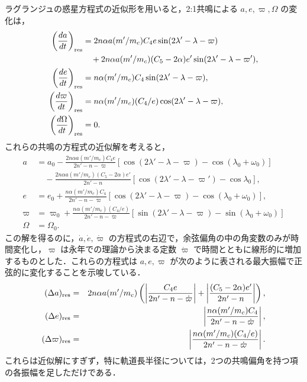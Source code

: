 \documentclass[11pt,a4paper,oneside,onecolumn]{jreport}
\begin{document}
ラグランジュの惑星方程式の近似形を用いると，2:1共鳴による $a, e, \varpi, \Omega$ の変化は，
\begin{align} 
\left( \frac{d a}{d t} \right)_{\rm res} & = 2 n \alpha a (m' / m_c) C_4 e \sin (2 \lambda' - \lambda - \varpi)\nonumber \\
& \quad + 2 n \alpha a (m' / m_c) (C_5 - 2 \alpha) e' \sin (2 \lambda' - \lambda - \varpi'), \\
\left( \frac{d e}{d t} \right)_{\rm res} & = n \alpha (m' / m_c) C_4 \sin (2 \lambda' - \lambda - \varpi), \\
\left( \frac{d \varpi}{d t} \right)_{\rm res} & = n \alpha (m' / m_c) (C_4 / e) \cos (2 \lambda' - \lambda - \varpi), \\
\left( \frac{d \Omega}{d t} \right)_{\rm res} & = 0.
\end{align}
これらの共鳴の方程式の近似解を考えると，
\begin{align}
a & = a_0 - \frac{2 n \alpha a (m' / m_c) C_4 e}{2 n' - n - \dot{\varpi}} [ \cos (2 \lambda' - \lambda - \varpi) - \cos (\lambda_0 + \omega_0) ] \nonumber \\
& \quad - \frac{2 n \alpha a (m' / m_c) (C_5 - 2 \alpha) e'}{2 n' - n} [\cos (2 \lambda' - \lambda - \varpi') - \cos \lambda_0 ], \\
e & = e_0 + \frac{n \alpha (m' / m_c) C_4}{2 n' - n - \dot{\varpi}} [\cos (2 \lambda' - \lambda - \varpi) - \cos (\lambda_0 + \omega_0) ], \\
\varpi & = \varpi_0 + \frac{n \alpha (m' / m_c) (C_4 / e)}{2 n' - n - \dot{\varpi}} [\sin (2 \lambda' - \lambda - \varpi) - \sin (\lambda_0 + \omega_0) ] \\
\Omega & = \Omega_0.
\end{align}
この解を得るのに，$\dot{a}, \dot{e}, \dot{\varpi}$ の方程式の右辺で，余弦偏角の中の角変数のみが時間変化し，$\varpi$ は永年での理論から決まる定数 $\dot{\varpi}$ で時間とともに線形的に増加するものとした．これらの方程式は $a, e, \varpi$ が次のように表される最大振幅で正弦的に変化することを示唆している．
\begin{eqnarray}
(\Delta a)_{\rm res} & = & 2 n \alpha a (m' / m_c) \left( \left| \frac{C_4 e}{2 n' - n - \dot{\varpi}} \right| + \left| \frac{(C_5 - 2 \alpha) e'}{2 n' - n} \right| \right), \label{eq:Delta_a} \\
(\Delta e)_{\rm res} & = & \left| \frac{n \alpha (m' / m_c) C_4}{2 n' - n - \dot{\varpi}} \right|, \label{eq:Delta_e} \\
(\Delta \varpi)_{\rm res} & = & \left| \frac{n \alpha (m' / m_c) (C_4 / e)}{2 n' - n - \dot{\varpi}} \right|. \label{eq:Delta_varpi}
\end{eqnarray}
これらは近似解にすぎず，特に軌道長半径については，2つの共鳴偏角を持つ項の各振幅を足しただけである．
\end{document}
